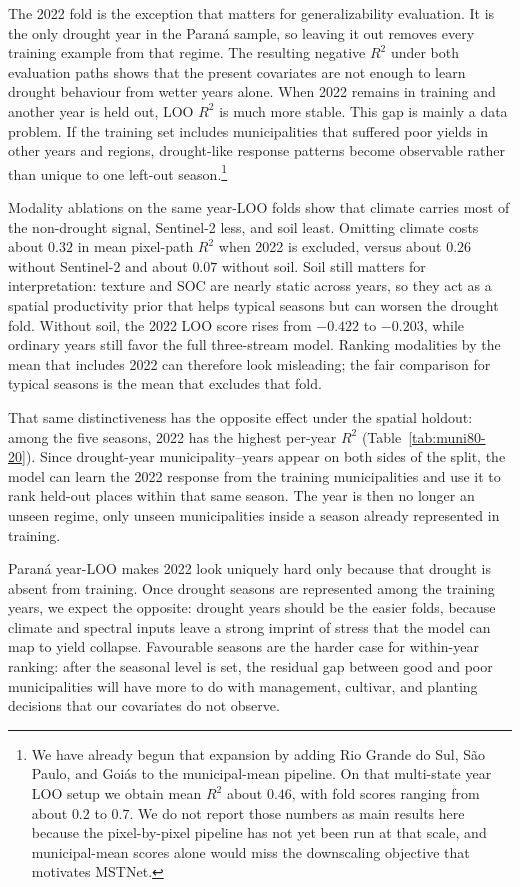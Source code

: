 The 2022 fold is the exception that matters for generalizability evaluation.
It is the only drought year in the Paran\'{a} sample, so leaving it out removes every training example from that regime.
The resulting negative $R^2$ under both evaluation paths shows that the present covariates are not enough to learn drought behaviour from wetter years alone.
When 2022 remains in training and another year is held out, LOO $R^2$ is much more stable.
This gap is mainly a data problem.
If the training set includes municipalities that suffered poor yields in other years and regions, drought-like response patterns become observable rather than unique to one left-out season.\footnote{We have already begun that expansion by adding Rio Grande do Sul, S\~{a}o Paulo, and Goi\'{a}s to the municipal-mean pipeline. On that multi-state year LOO setup we obtain mean $R^2$ about $0.46$, with fold scores ranging from about $0.2$ to $0.7$. We do not report those numbers as main results here because the pixel-by-pixel pipeline has not yet been run at that scale, and municipal-mean scores alone would miss the downscaling objective that motivates MSTNet.}

Modality ablations on the same year-LOO folds show that climate carries most of the non-drought signal, Sentinel-2 less, and soil least.
Omitting climate costs about $0.32$ in mean pixel-path $R^2$ when 2022 is excluded, versus about $0.26$ without Sentinel-2 and about $0.07$ without soil.
Soil still matters for interpretation: texture and SOC are nearly static across years, so they act as a spatial productivity prior that helps typical seasons but can worsen the drought fold.
Without soil, the 2022 LOO score rises from $-0.422$ to $-0.203$, while ordinary years still favor the full three-stream model.
Ranking modalities by the mean that includes 2022 can therefore look misleading; the fair comparison for typical seasons is the mean that excludes that fold.

That same distinctiveness has the opposite effect under the spatial holdout: among the five seasons, 2022 has the highest per-year $R^2$ (Table~\ref{tab:muni80-20}).
Since drought-year municipality--years appear on both sides of the split, the model can learn the 2022 response from the training municipalities and use it to rank held-out places within that same season. The year is then no longer an unseen regime, only unseen municipalities inside a season already represented in training.

Paran\'{a} year-LOO makes 2022 look uniquely hard only because that drought is absent from training.
Once drought seasons are represented among the training years, we expect the opposite: drought years should be the easier folds, because climate and spectral inputs leave a strong imprint of stress that the model can map to yield collapse.
Favourable seasons are the harder case for within-year ranking: after the seasonal level is set, the residual gap between good and poor municipalities will have more to do with management, cultivar, and planting decisions that our covariates do not observe.

